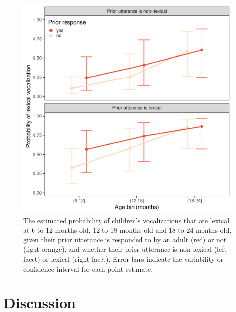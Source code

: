 \documentclass[
  man]{apa6}
\begin{document}
\begin{figure}
\centering
\includegraphics{turntaking_paper_files/figure-latex/social-loop-plot-1.pdf}
\caption{\label{fig:social-loop-plot}The estimated probability of children's vocalizations that are lexical at 6 to 12 months old, 12 to 18 months old and 18 to 24 months old, given their prior utterance is responded to by an adult (red) or not (light orange), and whether their prior utterance is non-lexical (left facet) or lexical (right facet). Error bars indicate the variability or confidence interval for each point estimate.}
\end{figure}

\hypertarget{discussion}{%
\section{Discussion}\label{discussion}}
\end{document}
